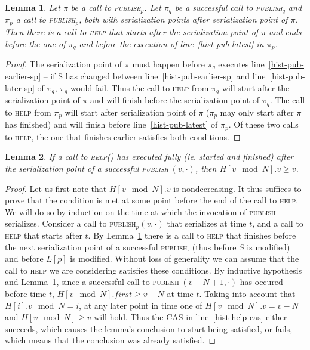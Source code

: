 \documentclass[a4paper,11pt]{article}
\newtheorem{lemma}{Lemma}
\newcommand{\fn}[1]{\textsc{#1}}
\begin{document}
\begin{lemma}\label{lem-hist-help-comes}
Let $\pi$ be a call to \fn{publish$_p$}. Let $\pi_q$ be a successful call to \fn{publish$_q$} and $\pi_p$ a call to \fn{publish$_p$}, both with serialization points after serialization point of $\pi$. Then there is a call to \fn{help} that starts after the serialization point of $\pi$ and ends before the one of $\pi_q$ and 
before the execution of line~\ref{hist-pub-latest} in $\pi_p$.
\end{lemma}
\begin{proof}
The serialization point of $\pi$ must happen before $\pi_q$ executes line~\ref{hist-pub-earlier-sp} -- if S has changed between line~\ref{hist-pub-earlier-sp} and line~\ref{hist-pub-later-sp} of $\pi_q$, $\pi_q$ would fail.
Thus the call to \fn{help} from $\pi_q$ will start after the serialization point of $\pi$ and will finish before the serialization point of $\pi_q$. The call to \fn{help}
from $\pi_p$ will start after serialization point of $\pi$ ($\pi_p$ may only start after $\pi$ has finished) and will finish before line~\ref{hist-pub-latest} of $\pi_p$.
Of these two calls to \fn{help}, the one that finishes earlier satisfies both conditions.
\end{proof}

\begin{lemma}
\label{lem-hist-is-complete}
If a call to \fn{help}() has executed fully (ie. started and finished) after the serialization point of a successful \fn{publish$_\cdot$}$(v, \cdot)$, then $H[v\mod N].v \geq v$.
\end{lemma}
\begin{proof}
Let us first note that $H[v\mod N].v$ is nondecreasing.
It thus suffices to prove that the condition is met at some point before the end of the call to \fn{help}. We will do so by induction on the time at which the invocation of \fn{publish} serializes.
Consider a call to \fn{publish$_p$}$(v, \cdot)$ that serializes at time $t$, and a call to \fn{help} that starts after $t$. By Lemma~\ref{lem-hist-help-comes} there is a call to \fn{help} that finishes before the next serialization point of a successful \fn{publish$_\cdot$} (thus before $S$
is modified) and before $L[p]$ is modified. Without loss of generality we can assume that the call to \fn{help} we are considering satisfies these conditions. By inductive hypothesis and Lemma~\ref{lem-hist-help-comes}, since a successful call to \fn{publish$_\cdot$}$(v-N+1, \cdot)$ has occured before time $t$, $H[v \mod N].first \geq v-N$ at time $t$. Taking into account that $H[i].v \mod N = i$, at any later point in time one of $H[v \mod N].v = v-N$ and $H[v \mod N] \geq v$ will hold.
Thus the CAS in line~\ref{hist-help-cas} either succeeds, which causes the lemma's conclusion to start being satisfied, or fails, which means that the conclusion was already satisfied.
\end{proof} %
\end{document}
